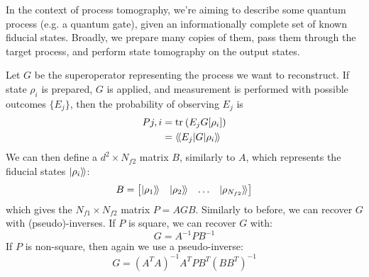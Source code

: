 In the context of process tomography, we're aiming to describe some quantum process (e.g. a quantum
gate), given an informationally complete set of known fiducial states. Broadly,
we prepare many copies of them, pass them through the target process, and perform state tomography
on the output states.

Let $G$ be the superoperator representing the process we want to reconstruct. If state $\rho_i$ is
prepared, $G$ is applied, and measurement is performed with possible outcomes $\{E_j\}$, then the
probability of observing $E_j$ is
\begin{equation}
    \begin{aligned}
        P{j,i} &= \text{tr}_{}\left(E_j G[\rho_i]\right) \\
               &= \langle\!\braket{E_j | G | \rho_i}\!\rangle
    \end{aligned}
\end{equation}
We can then define a $d^2 \times N_{f2}$ matrix $B$, similarly to $A$, which represents the fiducial
states $\ket{\rho_i}\!\rangle$:
\begin{equation}
    B = 
    \begin{bmatrix}
        \ket{\rho_1}\!\rangle & \ket{\rho_2}\!\rangle & \dots & \ket{\rho_{N_{f2}}}\!\rangle
    \end{bmatrix}
\end{equation}
which gives the $N_{f1} \times N_{f2}$ matrix $P = AGB$. Similarly to before, we can recover $G$ with
(pseudo)-inverses. If $P$ is square, we can recover $G$ with:
\begin{equation}
    G = A^{-1} P B^{-1}
\end{equation}
If $P$ is non-square, then again we use a pseudo-inverse:
\begin{equation}
    G = (A^T A)^{-1} A^T P B^T (B B^T)^{-1}
\end{equation}
